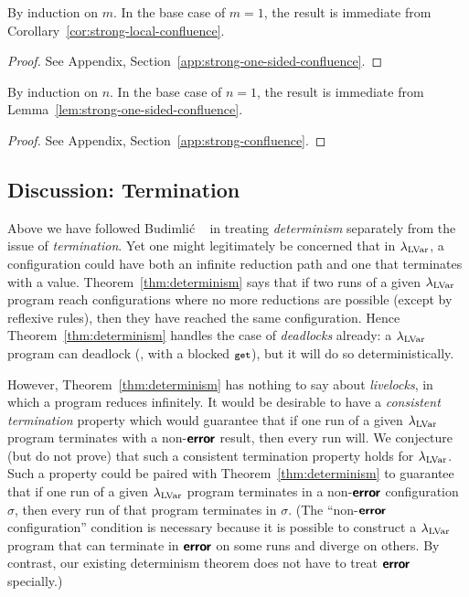\LemStrongOneSidedConfluence
\ifx\fulltr\undefined
\begin{proofsketch}
  By induction on $m$.  In the base case of $m = 1$, the
  result is immediate from Corollary~\ref{cor:strong-local-confluence}.
\end{proofsketch}
\else
\begin{proof}
See Appendix, Section~\ref{app:strong-one-sided-confluence}.
\end{proof}
\fi

\LemStrongConfluence
\ifx\fulltr\undefined
\begin{proofsketch}
  By induction on $n$.  In the base case of $n = 1$, the
  result is immediate from Lemma~\ref{lem:strong-one-sided-confluence}.
\end{proofsketch}
\else
\begin{proof}
See Appendix, Section~\ref{app:strong-confluence}.
\end{proof}
\fi

\LemConfluence

\ThmDeterminism

\subsection{Discussion: Termination}

Above we have followed Budimli\'c \etal~\cite{CnC} in treating {\em
  determinism} separately from the issue of {\em termination}.  Yet
one might legitimately be concerned that in $\textup{\ensuremath{\lambda_{\textrm{LVar}}}}$, a
configuration could have both an infinite reduction path and one that
terminates with a value.  Theorem~\ref{thm:determinism} says that if two runs of a
given $\textup{\ensuremath{\lambda_{\textrm{LVar}}}}$ program reach configurations where no more reductions
are possible (except by reflexive rules), 
then they have reached the same
configuration.  Hence Theorem~\ref{thm:determinism} handles the case of {\em
  deadlocks} already: a $\textup{\ensuremath{\lambda_{\textrm{LVar}}}}$ program can deadlock (\eg, with a blocked $\mbox{\footnotesize \texttt{get}}$), but it will do so deterministically.

However, Theorem~\ref{thm:determinism} has nothing to say about {\em
  livelocks}, in which a program reduces infinitely.  It would be
desirable to have a {\em consistent termination} property which
would guarantee that if one run of a given $\textup{\ensuremath{\lambda_{\textrm{LVar}}}}$ program terminates
with a non-$\textbf{\textsf{error}}$ result,
then every run will.
We
conjecture (but do not prove) that such a consistent termination property
holds for $\textup{\ensuremath{\lambda_{\textrm{LVar}}}}$.
Such a property could be paired with
Theorem~\ref{thm:determinism} to guarantee that if one run of a given
$\textup{\ensuremath{\lambda_{\textrm{LVar}}}}$ program terminates in a non-$\textbf{\textsf{error}}$ configuration $\sigma$, then every
run of that program terminates in $\sigma$.
(The ``non-$\textbf{\textsf{error}}$ configuration'' condition is necessary because it
is possible to construct a $\textup{\ensuremath{\lambda_{\textrm{LVar}}}}$ program that can terminate in
$\textbf{\textsf{error}}$ on some runs and diverge on others.
By contrast, our existing determinism theorem 
does not have to treat $\textbf{\textsf{error}}$
specially.)

